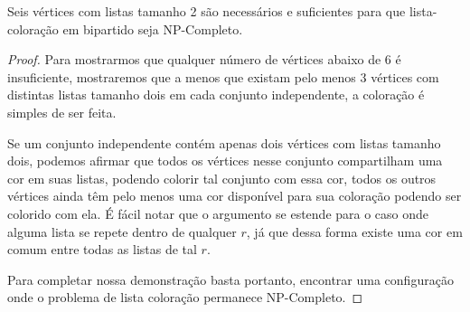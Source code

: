 \begin{teorema}
 Seis vértices com listas tamanho 2 são necessários e suficientes para que lista-coloração em bipartido seja NP-Completo.
\end{teorema}
\begin{proof}
 Para mostrarmos que qualquer número de vértices abaixo de 6 é insuficiente, mostraremos que a menos que existam pelo menos 3 vértices com distintas listas tamanho dois em cada conjunto independente, a coloração é simples de ser feita. 
 
 Se um conjunto independente contém apenas dois vértices com listas tamanho dois, podemos afirmar que todos os vértices nesse conjunto compartilham uma cor em suas listas, podendo colorir tal conjunto com essa cor, todos os outros vértices ainda têm pelo menos uma cor disponível para sua coloração podendo ser colorido com ela. É fácil notar que o argumento se estende para o caso onde alguma lista se repete dentro de qualquer $r$, já que dessa forma existe uma cor em comum entre todas as listas de tal $r$.
 
 Para completar nossa demonstração basta portanto, encontrar uma configuração onde o problema de lista coloração permanece NP-Completo.
 

\end{proof}
